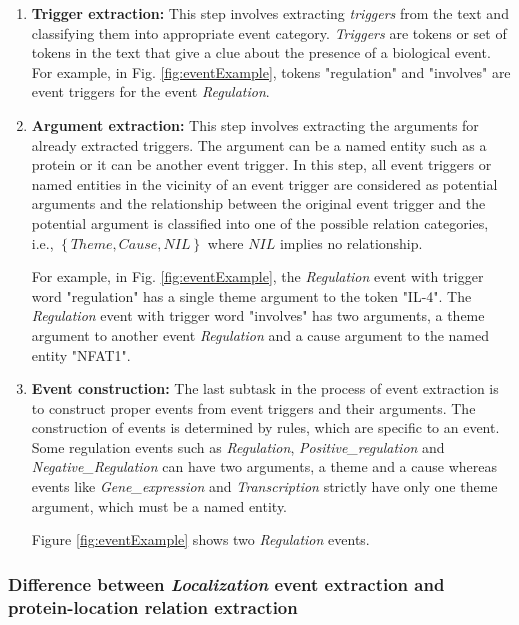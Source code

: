 \begin{enumerate}

\item \textbf{Trigger extraction:} This step involves extracting \textit{triggers} from the text and classifying them into appropriate event category. \textit{Triggers} are tokens or set of tokens in the text that give a clue about the presence of a biological event. For example, in Fig. \ref{fig:eventExample}, tokens "regulation" and "involves" are event triggers for the event \textit{Regulation}.

\item \textbf{Argument extraction: } This step involves extracting the arguments for already extracted triggers. The argument can be a named entity such as a protein or it can be another event trigger. In this step, all event triggers or named entities in the vicinity of an event trigger are considered as potential arguments and the relationship between the original event trigger and the potential argument is classified into one of the possible relation categories, i.e., $\left\lbrace Theme, Cause, NIL \right\rbrace$ where $NIL$ implies no relationship.

For example, in Fig. \ref{fig:eventExample}, the \textit{Regulation} event with trigger word "regulation" has a single theme argument to the token "IL-4". The \textit{Regulation} event with trigger word "involves" has two arguments, a theme argument to another event \textit{Regulation} and a cause argument to the named entity "NFAT1".

\item \textbf{Event construction: }  The last subtask in the process of event extraction is to construct proper events from event triggers and their arguments. The construction of events is determined by rules, which are specific to an event. Some regulation events such as \textit{Regulation}, \textit{Positive\_regulation} and \textit{Negative\_Regulation} can have two arguments, a theme and a cause whereas events like \textit{Gene\_expression} and \textit{Transcription} strictly have only one theme argument, which must be a named entity.

Figure \ref{fig:eventExample} shows two \textit{Regulation} events.

\end{enumerate}

\subsubsection{Difference between \textit{Localization} event extraction and protein-location relation extraction}

